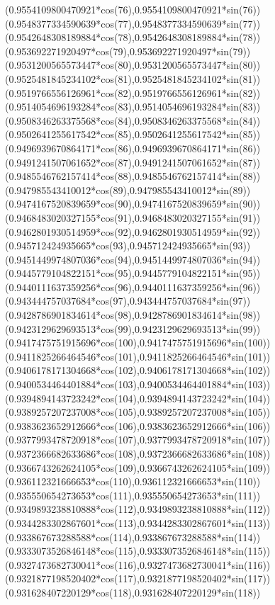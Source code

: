 {({0.9554109800470921*cos(76)},{0.9554109800470921*sin(76)})
({0.9548377334590639*cos(77)},{0.9548377334590639*sin(77)})
({0.9542648308189884*cos(78)},{0.9542648308189884*sin(78)})
({0.953692271920497*cos(79)},{0.953692271920497*sin(79)})
({0.9531200565573447*cos(80)},{0.9531200565573447*sin(80)})
({0.9525481845234102*cos(81)},{0.9525481845234102*sin(81)})
({0.9519766556126961*cos(82)},{0.9519766556126961*sin(82)})
({0.9514054696193284*cos(83)},{0.9514054696193284*sin(83)})
({0.9508346263375568*cos(84)},{0.9508346263375568*sin(84)})
({0.9502641255617542*cos(85)},{0.9502641255617542*sin(85)})
({0.9496939670864171*cos(86)},{0.9496939670864171*sin(86)})
({0.9491241507061652*cos(87)},{0.9491241507061652*sin(87)})
({0.9485546762157414*cos(88)},{0.9485546762157414*sin(88)})
({0.947985543410012*cos(89)},{0.947985543410012*sin(89)})
({0.9474167520839659*cos(90)},{0.9474167520839659*sin(90)})
({0.9468483020327155*cos(91)},{0.9468483020327155*sin(91)})
({0.9462801930514959*cos(92)},{0.9462801930514959*sin(92)})
({0.945712424935665*cos(93)},{0.945712424935665*sin(93)})
({0.9451449974807036*cos(94)},{0.9451449974807036*sin(94)})
({0.9445779104822151*cos(95)},{0.9445779104822151*sin(95)})
({0.9440111637359256*cos(96)},{0.9440111637359256*sin(96)})
({0.943444757037684*cos(97)},{0.943444757037684*sin(97)})
({0.9428786901834614*cos(98)},{0.9428786901834614*sin(98)})
({0.9423129629693513*cos(99)},{0.9423129629693513*sin(99)})
({0.9417475751915696*cos(100)},{0.9417475751915696*sin(100)})
({0.9411825266464546*cos(101)},{0.9411825266464546*sin(101)})
({0.9406178171304668*cos(102)},{0.9406178171304668*sin(102)})
({0.9400534464401884*cos(103)},{0.9400534464401884*sin(103)})
({0.9394894143723242*cos(104)},{0.9394894143723242*sin(104)})
({0.9389257207237008*cos(105)},{0.9389257207237008*sin(105)})
({0.9383623652912666*cos(106)},{0.9383623652912666*sin(106)})
({0.9377993478720918*cos(107)},{0.9377993478720918*sin(107)})
({0.9372366682633686*cos(108)},{0.9372366682633686*sin(108)})
({0.9366743262624105*cos(109)},{0.9366743262624105*sin(109)})
({0.936112321666653*cos(110)},{0.936112321666653*sin(110)})
({0.935550654273653*cos(111)},{0.935550654273653*sin(111)})
({0.9349893238810888*cos(112)},{0.9349893238810888*sin(112)})
({0.9344283302867601*cos(113)},{0.9344283302867601*sin(113)})
({0.933867673288588*cos(114)},{0.933867673288588*sin(114)})
({0.9333073526846148*cos(115)},{0.9333073526846148*sin(115)})
({0.9327473682730041*cos(116)},{0.9327473682730041*sin(116)})
({0.9321877198520402*cos(117)},{0.9321877198520402*sin(117)})
({0.931628407220129*cos(118)},{0.931628407220129*sin(118)})
}
